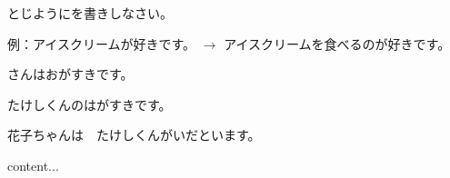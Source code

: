 
\author{Tomislav Mamić}

	
	\begin{mondai}{とじようにを書きしなさい。}
		\itemsep0pt
		\item 例：アイスクリームが好きです。 $\rightarrow$ アイスクリームを食べるのが好きです。
		\item {}さんはおがすきです。
		\item たけしくんのはがすきです。
		\item 花子ちゃんは　たけしくんがいだといます。
	\end{mondai}

	\begin{mondai}{}
		content...
	\end{mondai}
